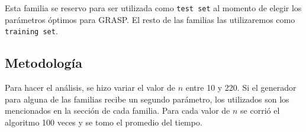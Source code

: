 Esta familia se reservo para ser utilizada como \texttt{test set} al momento de elegir los parámetros óptimos para GRASP. El resto de las familias las utilizaremos como \texttt{training set}.

\subsection{Metodología}

Para hacer el análisis, se hizo variar el valor de $n$ entre 10 y 220. Si el generador para alguna de las familias recibe un segundo parámetro, los utilizados son los mencionados en la sección de cada familia. Para cada valor de $n$ se corrió el algoritmo 100 veces y se tomo el promedio del tiempo.